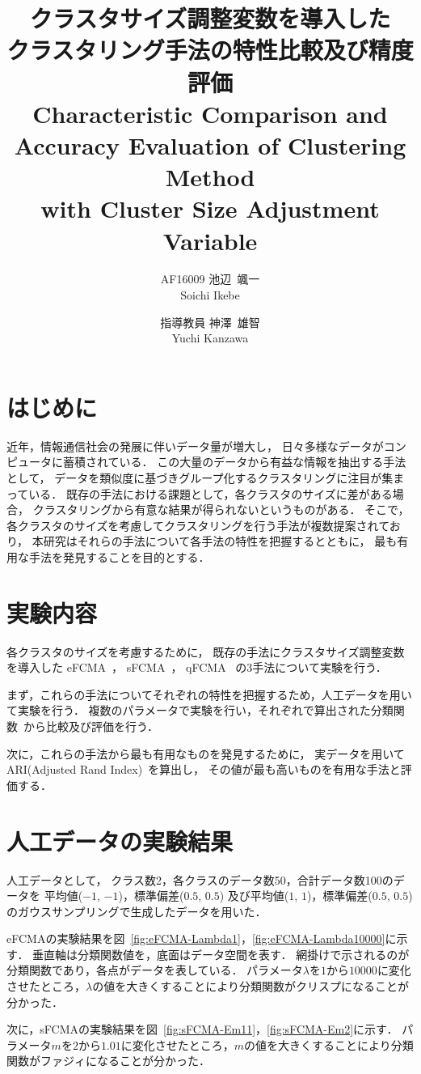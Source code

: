 \documentclass[twocolumn, a4paper]{icethesisabst}
\title{{\bf クラスタサイズ調整変数を導入した \\ クラスタリング手法の特性比較及び精度評価}
  {\normalsize \\ Characteristic Comparison and Accuracy Evaluation of Clustering Method \\ with Cluster Size Adjustment Variable}}
\author{
    AF16009 池辺~颯一 \\ Soichi Ikebe \and
    指導教員 神澤~雄智 \\ Yuchi Kanzawa
  }
\begin{document}
\maketitle


\section{はじめに}
近年，情報通信社会の発展に伴いデータ量が増大し，
日々多様なデータがコンピュータに蓄積されている．
この大量のデータから有益な情報を抽出する手法として，
データを類似度に基づきグループ化するクラスタリングに注目が集まっている．
既存の手法における課題として，各クラスタのサイズに差がある場合，
クラスタリングから有意な結果が得られないというものがある．
そこで，各クラスタのサイズを考慮してクラスタリングを行う手法が複数提案されており，
本研究はそれらの手法について各手法の特性を把握するとともに，
最も有用な手法を発見することを目的とする．


\section{実験内容}
各クラスタのサイズを考慮するために，
既存の手法にクラスタサイズ調整変数を導入した
eFCMA~\cite{eFCMA}，
sFCMA~\cite{sFCMA}，
qFCMA~\cite{qFCMA}
の3手法について実験を行う．

まず，これらの手法についてそれぞれの特性を把握するため，人工データを用いて実験を行う．
複数のパラメータで実験を行い，それぞれで算出された分類関数~\cite{cFunc}から比較及び評価を行う．

次に，これらの手法から最も有用なものを発見するために，
実データを用いてARI(Adjusted Rand Index)~\cite{ARI}を算出し，
その値が最も高いものを有用な手法と評価する．


\section{人工データの実験結果}
人工データとして，
クラス数2，各クラスのデータ数50，合計データ数100のデータを
平均値($-1$, $-1$)，標準偏差($0.5$, $0.5$)
及び平均値($1$, $1$)，標準偏差($0.5$, $0.5$)
のガウスサンプリングで生成したデータを用いた．

eFCMAの実験結果を図~\ref{fig:eFCMA-Lambda1}，\ref{fig:eFCMA-Lambda10000}に示す．
垂直軸は分類関数値を，底面はデータ空間を表す．
網掛けで示されるのが分類関数であり，各点がデータを表している．
パラメータ$\lambda$を$1$から$10000$に変化させたところ，$\lambda$の値を大きくすることにより分類関数がクリスプになることが分かった．

次に，sFCMAの実験結果を図~\ref{fig:sFCMA-Em11}，\ref{fig:sFCMA-Em2}に示す．
パラメータ$m$を$2$から$1.01$に変化させたところ，$m$の値を大きくすることにより分類関数がファジィになることが分かった．
\end{document}
